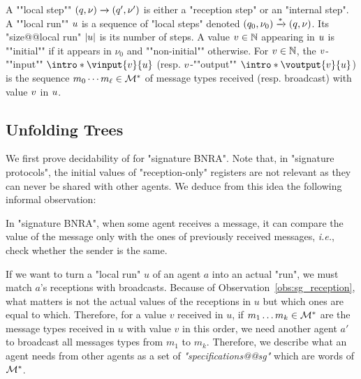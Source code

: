 	\AP A ""local step"" $(q,\nu) \xrightarrow{} (q',\nu')$ is either a "reception step" or an "internal step". 
	\AP A ""local run"" $u$ is a sequence of "local steps" denoted $(q_0, \nu_0) \xrightarrow{*} (q, \nu)$. Its "size@@local run" $|u|$ is its number of steps. %
	A value $v \in \mathbb{N}$ appearing in $u$ is ""initial"" if it appears in $\nu_0$ and ""non-initial"" otherwise. 
	For $v \in \mathbb{N}$, the $v$-""input"" $\intro*\vinput{\aval}{\localrun}$ (resp. $v$-""output"" $\intro*\voutput{\aval}{\localrun}$) is the sequence $m_0 \cdots m_{\ell} \in \mathcal{M}^*$ of message types received (resp. broadcast) with value $v$ in $u$.

\subsection{Unfolding Trees}
\label{sec:unfolding_tree_signature}

We first prove decidability of \COVER for "signature BNRA". Note that, in "signature protocols", the initial values of "reception-only" registers are not relevant as they can never be shared with other agents. We deduce from this idea the following informal observation:
\begin{observation}
\label{obs:sg_reception} 
In "signature BNRA", when some agent receives a message, it can compare the value of the message only with the ones of previously received messages, \emph{i.e.}, check whether the sender is the same.
\end{observation}

If we want to turn a "local run" $u$ of an agent $a$ into an actual "run", we must match $a$'s receptions with broadcasts. Because of Observation~\ref{obs:sg_reception}, what matters is not the actual values of the receptions in $u$ but which ones are equal to which.  Therefore, for a value $v$ received in $u$, if $m_1 \dots m_k \in \mathcal{M}^*$ are the message types received in $u$ with value $v$ in this order, we need another agent $a'$ to broadcast all messages types from $m_1$ to $m_k$.  
Therefore, we describe what an agent needs from other agents as a set of \emph{"specifications@@sg"} which are words of $\mathcal{M}^*$. 

